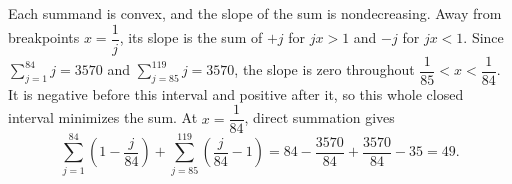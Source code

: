 Each summand is convex, and the slope of the sum is nondecreasing. Away from breakpoints $ x=\dfrac{1}{j}$, its slope is the sum of $+j $ for $ jx>1 $ and $-j $ for $ jx<1 $. Since $\sum_{j=1}^{84}j=3570 $ and $\sum_{j=85}^{119}j=3570 $, the slope is zero throughout $\dfrac{1}{85}<x<\dfrac{1}{84}$. It is negative before this interval and positive after it, so this whole closed interval minimizes the sum. At $ x=\dfrac{1}{84}$, direct summation gives
\[\sum_{j=1}^{84}(1-\dfrac{j}{84})+\sum_{j=85}^{119}(\dfrac{j}{84}-1)=84-\dfrac{3570}{84}+\dfrac{3570}{84}-35=\boxed{49}.\]
